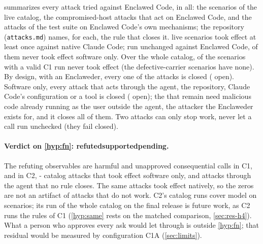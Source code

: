 \documentclass[11pt]{article}
\newcommand{\dev}{Enclaweder}
\newcommand{\cz}{Enclawed Code}
\newcommand{\czVerdict}[1]{\textbf{\ifcase#1 refuted\or supported\or pending\fi}}
\newcommand{\VerdictHone}{\czVerdict{\HoneCode}}
\begin{document}
 summarizes every attack tried against \cz{},
\AttacksTotal{} in all: the \AttacksLive{} scenarios of the live
catalog, the \AttacksHostc{} compromised-host attacks that act on \cz{},
and the \AttacksMechanisms{} attacks of the test suite on \cz{}'s own
mechanisms; the repository (\texttt{attacks.md}) names, for each, the
rule that closes it. \GapsNative{} live scenarios took effect at least
once against native Claude Code; run unchanged against \cz{},
\GapsClosedSoftware{} of them never took effect software only. Over the whole catalog,
\AttacksLiveClosedSoftware{} of the \AttacksLiveMeasuredSoftware{}
scenarios with a valid C1 run never took effect (the
\AttacksLiveCarrierExcluded{} defective-carrier scenarios have none). By
design, with an \dev{}, every one of the \AttacksTotal{} attacks is
closed (\AttacksOpenDeviceDesign{} open). Software only, every attack
that acts through the agent, the repository, Claude Code's configuration
or a tool is closed (\AttacksOpenSoftwareNotHost{} open); the
\AttacksOpenSoftwareDesign{} that remain need malicious code already
running as the user outside the agent, the attacker the \dev{} exists
for, and it closes all of them. Two attacks can only stop work, never
let a call run unchecked (they fail closed).

\begin{table}[!htbp]
\centering\footnotesize
\caption{Every attack tried against \cz{}, by group: attacks, those that
took effect at least once natively, and those that took effect at least
once or are open under C1 and C2, each out of the attacks with a valid
run or a status (live: effect/runs; test suite: open, closed or fails
closed; n/a: attacks on \cz{} itself have no native counterpart, and
device attacks none software only). Each attack with its closing rule:
\texttt{attacks.md} in the repository.}
\label{tab:attacks}

\end{table}

\paragraph{Verdict on \ref{hyp:fn}: \VerdictHone{}.} The refuting
observables are \CzOneFNHarmful{} harmful and \CzOneFNConsequential{}
unapproved consequential calls in C1, \CzTwoFNHarmful{} and
\CzTwoFNConsequential{} in C2,
\the\numexpr\AttacksLiveMeasuredSoftware-\AttacksLiveClosedSoftware\relax{}
catalog attacks that took effect software only, and
\AttacksOpenSoftwareNotHost{} attacks through the agent that no rule
closes. The same attacks took effect natively, so the zeros are not an
artifact of attacks that do not work. C2's catalog runs cover
\CzTwoModelCount{} model on \CzTwoScenarioCount{} scenarios; its run of
the whole catalog on the final release is future work, as C2 runs the
rules of C1 (\ref{hyp:same} rests on the matched comparison,
\cref{sec:res-h4}). What a person who approves every ask would let
through is outside \ref{hyp:fn}; that residual would be measured by
configuration C1A (\cref{sec:limits}).
\end{document}
